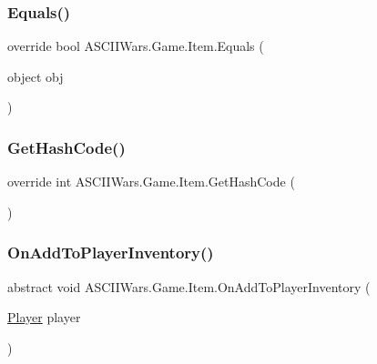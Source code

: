 \subsubsection{\texorpdfstring{Equals()}{Equals()}}
{\footnotesize\ttfamily override bool A\+S\+C\+I\+I\+Wars.\+Game.\+Item.\+Equals (\begin{DoxyParamCaption}\item[{object}]{obj }\end{DoxyParamCaption})\hspace{0.3cm}{\ttfamily [inline]}}

\hypertarget{class_a_s_c_i_i_wars_1_1_game_1_1_item_aa503cb0e59f19deb5124271048735de4}{}\label{class_a_s_c_i_i_wars_1_1_game_1_1_item_aa503cb0e59f19deb5124271048735de4} 
\subsubsection{\texorpdfstring{Get\+Hash\+Code()}{GetHashCode()}}
{\footnotesize\ttfamily override int A\+S\+C\+I\+I\+Wars.\+Game.\+Item.\+Get\+Hash\+Code (\begin{DoxyParamCaption}{ }\end{DoxyParamCaption})\hspace{0.3cm}{\ttfamily [inline]}}

\hypertarget{class_a_s_c_i_i_wars_1_1_game_1_1_item_aec0355b7a9f647ef24897b95563f70d1}{}\label{class_a_s_c_i_i_wars_1_1_game_1_1_item_aec0355b7a9f647ef24897b95563f70d1} 
\subsubsection{\texorpdfstring{On\+Add\+To\+Player\+Inventory()}{OnAddToPlayerInventory()}}
{\footnotesize\ttfamily abstract void A\+S\+C\+I\+I\+Wars.\+Game.\+Item.\+On\+Add\+To\+Player\+Inventory (\begin{DoxyParamCaption}\item[{\hyperlink{class_a_s_c_i_i_wars_1_1_game_1_1_player}{Player}}]{player }\end{DoxyParamCaption})\hspace{0.3cm}{\ttfamily [pure virtual]}}



